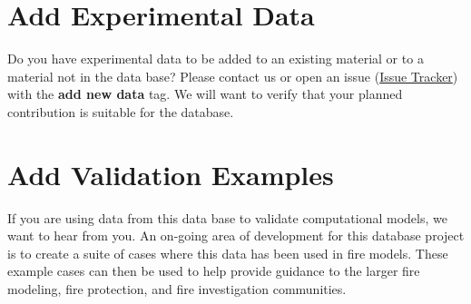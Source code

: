 \documentclass[12pt,oneside]{book}
\begin{document}
\section{Add Experimental Data}
Do you have experimental data to be added to an existing material or to a material not in the data base? Please contact us or open an issue (\href{https://github.com/ulfsri/fsri_materials_database/issues}{Issue Tracker}) with the {\bf add new data} tag. We will want to verify that your planned contribution is suitable for the database. 

\section{Add Validation Examples}
If you are using data from this data base to validate computational models, we want to hear from you. An on-going area of development for this database project is to create a suite of cases where this data has been used in fire models. These example cases can then be used to help provide guidance to the larger fire modeling, fire protection, and fire investigation communities.



% 
\end{document}
